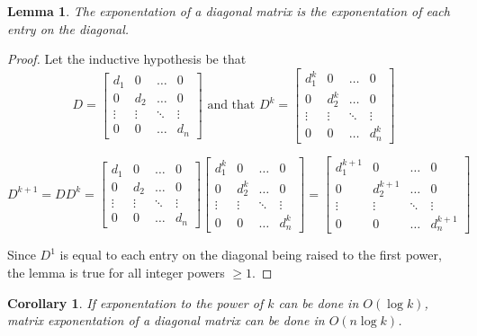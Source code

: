 \documentclass[11pt, oneside]{article}
\theoremstyle{plain}
\newtheorem{corollary}{Corollary}[theorem]
\newtheorem{lemma}[theorem]{Lemma}
\theoremstyle{definition}
\begin{document}
\begin{lemma}
The exponentation of a diagonal matrix is the exponentation of each entry on the diagonal.
\end{lemma}
\begin{proof}
Let the inductive hypothesis be that \[ D = \begin{bmatrix}
  d_1 & 0 & \dots & 0 \\
  0 & d_2 & \dots & 0 \\
  \vdots & \vdots & \ddots & \vdots \\
  0 & 0 & \dots & d_n
\end{bmatrix}
\text{ and that }
D^k = \begin{bmatrix}
  d_1^k & 0 & \dots & 0 \\
  0 & d_2^k & \dots & 0 \\
  \vdots & \vdots & \ddots & \vdots \\
  0 & 0 & \dots & d_n^k
\end{bmatrix} \]

\[ D^{k + 1} = D D^k =
\begin{bmatrix}
  d_1 & 0 & \dots & 0 \\
  0 & d_2 & \dots & 0 \\
  \vdots & \vdots & \ddots & \vdots \\
  0 & 0 & \dots & d_n
\end{bmatrix}
\begin{bmatrix}
  d_1^k & 0 & \dots & 0 \\
  0 & d_2^k & \dots & 0 \\
  \vdots & \vdots & \ddots & \vdots \\
  0 & 0 & \dots & d_n^k
\end{bmatrix}
=
\begin{bmatrix}
  d_1^{k + 1} & 0 & \dots & 0 \\
  0 & d_2^{k + 1} & \dots & 0 \\
  \vdots & \vdots & \ddots & \vdots \\
  0 & 0 & \dots & d_n^{k + 1}
\end{bmatrix}
\]

Since \( D^1 \) is equal to each entry on the diagonal being raised
to the first power, the lemma is true for all integer powers \( \geq 1\).
\end{proof}

\begin{corollary}
If exponentation to the power of \( k \) can be done in \( O(\log k) \),
matrix exponentation of a diagonal matrix can be done in \( O(n \log k) \).
\end{corollary}
\end{document}
